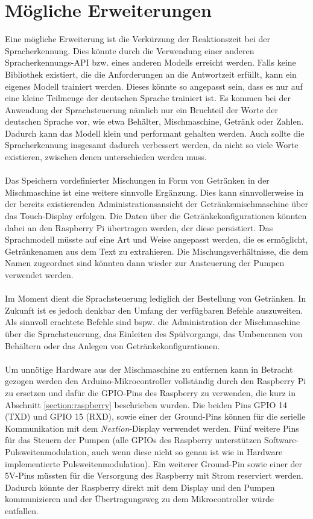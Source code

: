 \section{Mögliche Erweiterungen}
Eine mögliche Erweiterung ist die Verkürzung der Reaktionszeit bei der Spracherkennung. Dies könnte durch die Verwendung einer anderen Spracherkennungs-\ac{API} bzw. eines anderen Modells erreicht werden. Falls keine Bibliothek existiert, die die Anforderungen an die Antwortzeit erfüllt, kann ein eigenes Modell trainiert werden. Dieses könnte so angepasst sein, dass es nur auf eine kleine Teilmenge der deutschen Sprache trainiert ist. Es kommen bei der Anwendung der Sprachsteuerung nämlich nur ein Bruchteil der Worte der deutschen Sprache vor, wie etwa \glqq{}Behälter\grqq{}, \glqq{}Mischmaschine\grqq{}, \glqq{}Getränk\grqq{} oder Zahlen. Dadurch kann das Modell klein und performant gehalten werden. Auch sollte die Spracherkennung insgesamt dadurch verbessert werden, da nicht so viele Worte existieren, zwischen denen unterschieden werden muss.\\\\
Das Speichern vordefinierter Mischungen in Form von Getränken in der Mischmaschine ist eine weitere sinnvolle Ergänzung. Dies kann sinnvollerweise in der bereits existierenden Administrationsansicht der Getränkemischmaschine über das Touch-Display erfolgen. Die Daten über die Getränkekonfigurationen könnten dabei an den Raspberry Pi übertragen werden, der diese persistiert. Das Sprachmodell müsste auf eine Art und Weise angepasst werden, die es ermöglicht, Getränkenamen aus dem Text zu extrahieren. Die Mischungsverhältnisse, die dem Namen zugeordnet sind könnten dann wieder zur Ansteuerung der Pumpen verwendet werden.\\\\
Im Moment dient die Sprachsteuerung lediglich der Bestellung von Getränken. In Zukunft ist es jedoch denkbar den Umfang der verfügbaren Befehle auszuweiten. Als sinnvoll erachtete Befehle sind bspw. die Administration der Mischmaschine über die Sprachsteuerung, das Einleiten des Spülvorgangs, das Umbenennen von Behältern oder das Anlegen von Getränkekonfigurationen.\\\\
Um unnötige Hardware aus der Mischmaschine zu entfernen kann in Betracht gezogen werden den Arduino-Mikrocontroller vollständig durch den Raspberry Pi zu ersetzen und dafür die \ac{GPIO}-Pins des Raspberry zu verwenden, die kurz in Abschnitt \ref{section:raspberry} beschrieben wurden. Die beiden Pins GPIO 14 (TXD) und GPIO 15 (RXD), sowie einer der Ground-Pins können für die serielle Kommunikation mit dem \textit{Nextion}-Display verwendet werden. Fünf weitere Pins für das Steuern der Pumpen (alle \ac{GPIO}s des Raspberry unterstützen Software-Pulsweitenmodulation, auch wenn diese nicht so genau ist wie in Hardware implementierte Pulsweitenmodulation). Ein weiterer Ground-Pin sowie einer der 5V-Pins müssten für die Versorgung des Raspberry mit Strom reserviert werden. Dadurch könnte der Raspberry direkt mit dem Display und den Pumpen kommunizieren und der Übertragungsweg zu dem Mikrocontroller würde entfallen.\\\\
